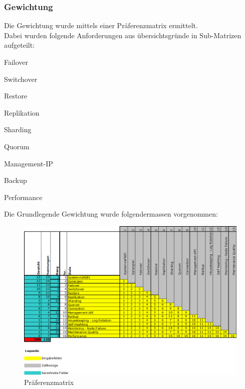 \subsubsection{Gewichtung}
\begin{flushleft}
    Die Gewichtung wurde mittels einer Präferenzmatrix ermittelt.\\
    Dabei wurden folgende Anforderungen aus übersichtsgründe in Sub-Matrizen aufgeteilt:
    \begin{description}
        \item Failover
        \item Switchover
        \item Restore
        \item Replikation
        \item Sharding
        \item Quorum
        \item Management-IP
        \item Backup
        \item Performance
    \end{description}

    Die Grundlegende Gewichtung wurde folgendermassen vorgenommen:
    \begin{figure}[H]
        \centering
        \includegraphics[width=1\linewidth]{source/implementation/evaluation/requirements/preference_matrix}
        \caption{Präferenzmatrix}
        \label{fig:preference_matrix}
    \end{figure}
\end{flushleft}
